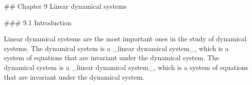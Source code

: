 

## Chapter 9 Linear dynamical systems

### 9.1 Introduction

Linear dynamical systems are the most important ones in the study of dynamical systems. The dynamical system is a _linear dynamical system_, which is a system of equations that are invariant under the dynamical system. The dynamical system is a _linear dynamical system_, which is a system of equations that are invariant under the dynamical system.

